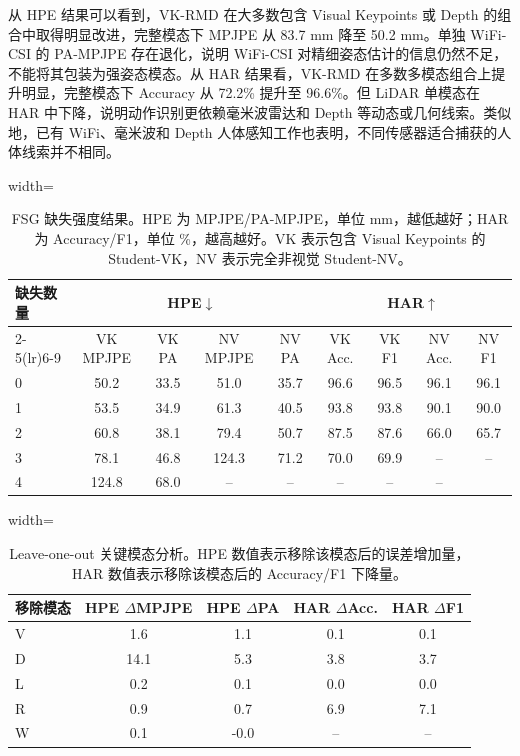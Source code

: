\documentclass[journal]{IEEEtran}
\newcommand{\parahead}[1]{\vspace{0.4em}\noindent{\textbf{#1}}}
\begin{document}
从 HPE 结果可以看到，VK-RMD 在大多数包含 Visual Keypoints 或 Depth 的组合中取得明显改进，完整模态下 MPJPE 从 83.7 mm 降至 50.2 mm。单独 WiFi-CSI 的 PA-MPJPE 存在退化，说明 WiFi-CSI 对精细姿态估计的信息仍然不足，不能将其包装为强姿态模态。从 HAR 结果看，VK-RMD 在多数多模态组合上提升明显，完整模态下 Accuracy 从 72.2\% 提升至 96.6\%。但 LiDAR 单模态在 HAR 中下降，说明动作识别更依赖毫米波雷达和 Depth 等动态或几何线索。类似地，已有 WiFi、毫米波和 Depth 人体感知工作也表明，不同传感器适合捕获的人体线索并不相同\cite{metafi,virteach,adapose,robustwifi,wifiSurvey,shotton2011}。

\parahead{缺失强度、关键模态与跨协议泛化。}
\begin{table}[!t]
\centering
\caption{FSG 缺失强度结果。HPE 为 MPJPE/PA-MPJPE，单位 mm，越低越好；HAR 为 Accuracy/F1，单位 \%，越高越好。VK 表示包含 Visual Keypoints 的 Student-VK，NV 表示完全非视觉 Student-NV。}
\label{tab:severity_add}
\scriptsize
\begin{adjustbox}{width=\textwidth}
\begin{tabular}{lcccccccc}
\toprule
\multirow{2}{*}{缺失数量} & \multicolumn{4}{c}{HPE$\downarrow$} & \multicolumn{4}{c}{HAR$\uparrow$} \\
\cmidrule(lr){2-5}\cmidrule(lr){6-9}
 & VK MPJPE & VK PA & NV MPJPE & NV PA & VK Acc. & VK F1 & NV Acc. & NV F1 \\
\midrule
0 & 50.2 & 33.5 & 51.0 & 35.7 & 96.6 & 96.5 & 96.1 & 96.1 \\
1 & 53.5 & 34.9 & 61.3 & 40.5 & 93.8 & 93.8 & 90.1 & 90.0 \\
2 & 60.8 & 38.1 & 79.4 & 50.7 & 87.5 & 87.6 & 66.0 & 65.7 \\
3 & 78.1 & 46.8 & 124.3 & 71.2 & 70.0 & 69.9 & -- & -- \\
4 & 124.8 & 68.0 & -- & -- & -- & -- & -- \\
\bottomrule
\end{tabular}
\end{adjustbox}
\end{table}

\begin{table}[!t]
\centering
\caption{Leave-one-out 关键模态分析。HPE 数值表示移除该模态后的误差增加量，HAR 数值表示移除该模态后的 Accuracy/F1 下降量。}
\label{tab:loo_add}
\scriptsize
\begin{adjustbox}{width=\linewidth}
\begin{tabular}{lcccc}
\toprule
移除模态 & HPE $\Delta$MPJPE & HPE $\Delta$PA & HAR $\Delta$Acc. & HAR $\Delta$F1 \\
\midrule
V & 1.6 & 1.1 & 0.1 & 0.1 \\
D & 14.1 & 5.3 & 3.8 & 3.7 \\
L & 0.2 & 0.1 & 0.0 & 0.0 \\
R & 0.9 & 0.7 & 6.9 & 7.1 \\
W & 0.1 & -0.0 & -- & -- \\
\bottomrule
\end{tabular}
\end{adjustbox}
\end{table}
\end{document}
